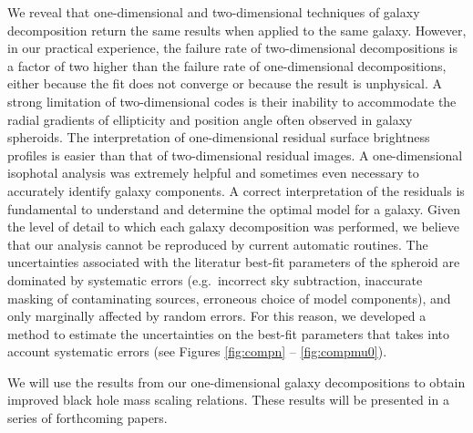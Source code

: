 \documentclass[preprint2]{emulateapj}
\begin{document}
We reveal that one-dimensional and two-dimensional techniques of galaxy decomposition return the same results when applied to the same galaxy.
However, in our practical experience, the failure rate of two-dimensional decompositions 
is a factor of two higher than the failure rate of one-dimensional decompositions,  
either because the fit does not converge or because the result is unphysical. 
A strong limitation of two-dimensional codes is their inability to accommodate the radial gradients of ellipticity and position angle 
often observed in galaxy spheroids.
The interpretation of one-dimensional residual surface brightness profiles is easier than that of two-dimensional residual images. 
A one-dimensional isophotal analysis was extremely helpful and sometimes even necessary to accurately identify galaxy components.
A correct interpretation of the residuals is fundamental to understand and determine the optimal model for a galaxy.
Given the level of detail to which each galaxy decomposition was performed, 
we believe that our analysis cannot be reproduced by current automatic routines. 
The uncertainties associated with the literatur best-fit parameters of the spheroid are dominated by systematic errors (e.g.~incorrect sky subtraction, 
inaccurate masking of contaminating sources, erroneous choice of model components), and only marginally affected by random errors. 
For this reason, we developed a method to estimate the uncertainties on the best-fit parameters that takes into account systematic errors 
(see Figures \ref{fig:compn} -- \ref{fig:compmu0}).

We will use the results from our one-dimensional galaxy decompositions to obtain improved black hole mass scaling relations. 
These results will be presented in a series of forthcoming papers.



\end{document}
